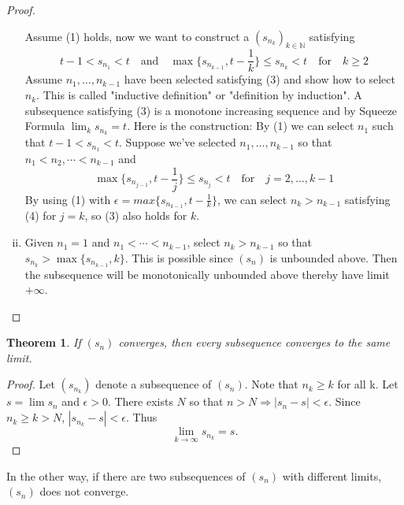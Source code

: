 \documentclass[12pt, lettersize]{book}
\theoremstyle{plain}
\newtheorem{thm}{Theorem}[section]
\theoremstyle{definition}
\theoremstyle{remark}
\begin{document}
\begin{proof}
\begin{enumerate}[(i)]
			Assume (1) holds, now we want to construct a $(s_{n_k})_{k\in\mathbb{N}}$ satisfying
			\begin{equation}
				t-1<s_{n_1}<t\quad\text{and}\quad\max\{s_{n_{k-1}},t-\frac{1}{k}\}\leq s_{n_k}<t\quad\text{for}\quad k\geq2
			\end{equation}
			Assume $n_1,\dots,n_{k-1}$ have been selected satisfying (3) and show how to select $n_k$. This is called "inductive definition" or "definition by induction". A subsequence satisfying (3) is a monotone increasing sequence and by Squeeze Formula $\lim_ks_{n_k}=t$. Here is the construction:
			By (1) we can select $n_1$ such that $t-1<s_{n_1}<t$. Suppose we've selected $n_1,\dots,n_{k-1}$ so that $n_1<n_2,\cdots<n_{k-1}$ and
			\begin{equation}
				\max\{s_{n_{j-1}},t-\frac{1}{j}\}\leq s_{n_j}<t\quad\text{for}\quad j=2,\dots,k-1
			\end{equation}
			By using (1) with $\epsilon=max\{s_{n_{k-1}},t-\frac{1}{k}\}$, we can select $n_k>n_{k-1}$ satisfying (4) for $j=k$, so (3) also holds for $k$. 
			\item Given $n_1=1$ and $n_1<\cdots<n_{k-1}$, select $n_k>n_{k-1}$ so that $s_{n_k}>\max\{s_{n_{k-1}},k\}$. This is possible since $(s_n)$ is unbounded above. Then the subsequence will be monotonically unbounded above thereby have limit $+\infty$.
		\end{enumerate}
		\end{proof}
		
		\begin{thm}\label{def:subsequence converges to the same limit}
		If $(s_n)$ converges, then every subsequence converges to the same limit.
		\end{thm}
		\begin{proof}
		Let $(s_{n_k})$ denote a subsequence of $(s_n)$. Note that $n_k\geq k$ for all k. Let $s=\lim s_n$ and $\epsilon>0$. There exists $N$ so that $n>N\Rightarrow|s_n-s|<\epsilon$. Since $n_k\geq k>N$, $|s_{n_k}-s|<\epsilon$. Thus
		\begin{displaymath}
			\lim\limits_{k\rightarrow\infty}s_{n_k}=s.
		\end{displaymath}
		\end{proof}
		In the other way, if there are two subsequences of $(s_n)$ with different limits, $(s_n)$ does not converge.
		
\end{document}
